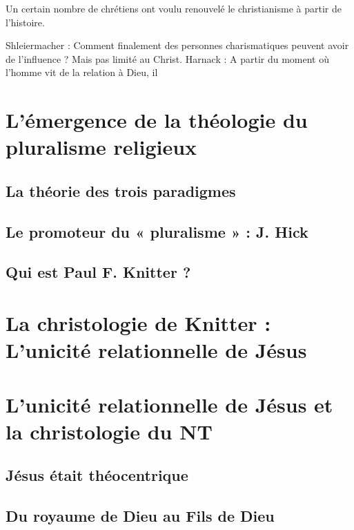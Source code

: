 Un certain nombre de chrétiens ont voulu renouvelé le christianisme à partir de l'histoire. 

Shleiermacher :  Comment finalement des personnes charismatiques peuvent avoir de l'influence ? Mais pas limité au Christ.
Harnack : A partir du moment où l'homme vit de la relation à Dieu, il 



\section{L’émergence de la théologie du pluralisme religieux}
\subsection{La théorie des trois paradigmes}
 

\subsection{Le promoteur du « pluralisme » : J. Hick}
 

\subsection{Qui est Paul F. Knitter ?}
 


\section{La christologie de Knitter : L’unicité relationnelle de Jésus}

\section{L’unicité relationnelle de Jésus et la christologie du NT}

\subsection{Jésus était théocentrique}
 
 
\subsection{Du royaume de Dieu au Fils de Dieu}

